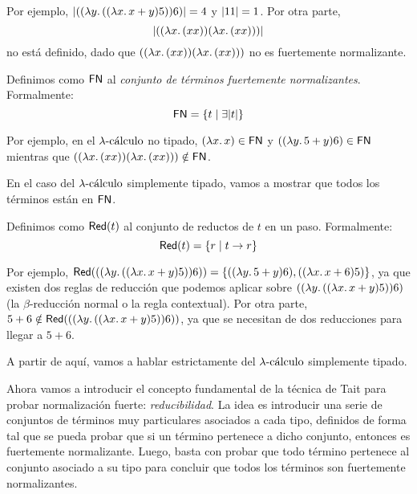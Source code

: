 Por ejemplo, \( \lpl{\lcapp{\lcabstr{y}{\lcapp{\lcabstr{x}{x + y}}{5}}}{6}} = 4 \) y \( \lpl{11} = 1 \).
Por otra parte,
\[  \lpl{\lcapp{\lcabstr{x}{\lcapp{x}{x}}}{\lcabstr{x}{\lcapp{x}{x}}}}
\]
no está definido, dado que \( \lcapp{ \lcabstr{x}{\lcapp{x}{x}} }{ \lcabstr{x}{\lcapp{x}{x}} } \) no es fuertemente normalizante.

\begin{definition}
  Definimos como \( \snset \) al \textit{conjunto de términos fuertemente normalizantes}. Formalmente:
  \[ \snset = \{ t \mid \exists \lpl{t} \} \]
\end{definition}

Por ejemplo, en el \( \lambdacalculus \) no tipado, \( \lcabstr{x}{x} \in \snset \) y \( \lcapp{\lcabstr{y}{5 + y}}{6} \in \snset \) mientras que \( \lcapp{ \lcabstr{x}{\lcapp{x}{x}} }{ \lcabstr{x}{\lcapp{x}{x}} } \notin \snset \).

En el caso del \( \lambdacalculus \) simplemente tipado, vamos a mostrar que todos los términos están en \( \snset \).

\begin{definition}
  Definimos como \( \red{t} \) al conjunto de reductos de \( t \) en un paso. Formalmente:
  \[ \red{t} = \{r \mid t \reducesto r\} \]
\end{definition}

Por ejemplo,
\( \red{\lcapp{\lcabstr{y}{\lcapp{\lcabstr{x}{x + y}}{5}}}{6}} = \{\lcapp{\lcabstr{y}{5 + y}}{6}, \lcapp{\lcabstr{x}{x + 6}}{5}\} \),
ya que existen dos reglas de reducción que podemos aplicar sobre \( \lcapp{\lcabstr{y}{\lcapp{\lcabstr{x}{x + y}}{5}}}{6} \) (la \( \beta \)-reducción normal o la regla contextual).
Por otra parte, \( 5 + 6 \notin \red{\lcapp{\lcabstr{y}{\lcapp{\lcabstr{x}{x + y}}{5}}}{6}} \), ya que se necesitan de dos reducciones para llegar a \( 5 + 6 \).

A partir de aquí, vamos a hablar estrictamente del \( \lambdacalculus \) simplemente tipado.

Ahora vamos a introducir el concepto fundamental de la técnica de Tait para probar normalización fuerte: \textit{reducibilidad}. La idea es introducir una serie de conjuntos de términos muy particulares asociados a cada tipo, definidos de forma tal que se pueda probar que si un término pertenece a dicho conjunto, entonces es fuertemente normalizante. Luego, basta con probar que todo término pertenece al conjunto asociado a su tipo para concluir que todos los términos son fuertemente normalizantes.

